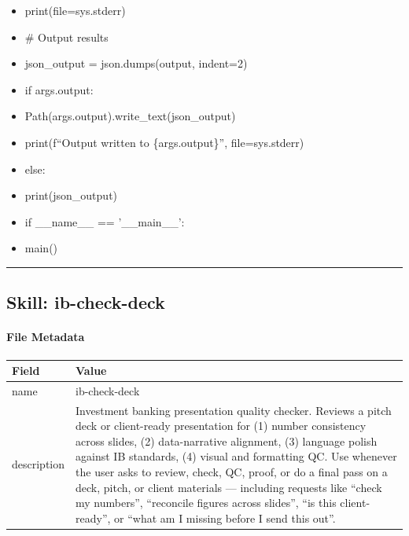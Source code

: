 \documentclass[11pt]{article}
\begin{document}
\begin{itemize}[leftmargin=*,itemsep=2pt,topsep=2pt]
\item {} print(file=sys.stderr)
\item {} \# Output results
\item {} json\_\allowbreak{}output = json.dumps(output, indent=2)
\item {} if args.output:
\item {} Path(args.output).write\_\allowbreak{}text(json\_\allowbreak{}output)
\item {} print(f``Output written to \{args.output\}'', file=sys.stderr)
\item {} else:
\item {} print(json\_\allowbreak{}output)
\item {} if \_\allowbreak{}\_\allowbreak{}name\_\allowbreak{}\_\allowbreak{} == '\_\allowbreak{}\_\allowbreak{}main\_\allowbreak{}\_\allowbreak{}':
\item {} main()
\end{itemize}

\vspace{0.8em}\hrule\vspace{0.8em}

\subsection{Skill: ib-check-deck}\label{file:skills-ib-check-deck-SKILL-md}

\paragraph{File Metadata}\mbox{}\par
\begingroup
\small
\setlength{\tabcolsep}{2pt}
\begin{longtable}{>{\RaggedRight\arraybackslash\hspace{0pt}}p{}>{\RaggedRight\arraybackslash\hspace{0pt}}p{}}
\toprule
{} \textbf{Field} & \textbf{Value} \\
\midrule
{} name & ib-check-deck \\
{} description & Investment banking presentation quality checker. Reviews a pitch deck or client-ready presentation for (1) number consistency across slides, (2) data-narrative alignment, (3) language polish against IB standards, (4) visual and formatting QC. Use whenever the user asks to review, check, QC, proof, or do a final pass on a deck, pitch, or client materials — including requests like ``check my numbers'', ``reconcile figures across slides'', ``is this client-ready'', or ``what am I missing before I send this out''. \\
\bottomrule
\end{longtable}
\endgroup
\end{document}
